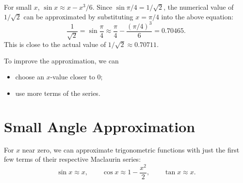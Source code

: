 \begin{example}
    For small $x$, $\sin x \approx x - x^3/6$. Since $\sin{\pi/4} = 1/\sqrt{2}$, the numerical value of $1/\sqrt{2}$ can be approximated by substituting $x = \pi/4$ into the above equation: \[\frac1{\sqrt2} = \sin \frac{\pi}4 \approx \frac{\pi}4 - \frac{(\pi/4)^3}{6} = 0.70465.\] This is close to the actual value of $1/\sqrt{2} \approx 0.70711$.
\end{example}

To improve the approximation, we can 
\begin{itemize}
    \item choose an $x$-value closer to 0;
    \item use more terms of the series.
\end{itemize}

\section{Small Angle Approximation}

For $x$ near zero, we can approximate trigonometric functions with just the first few terms of their respective Maclaurin series: \[\sin x \approx x, \qquad \cos x \approx 1- \frac{x^2}{2}, \qquad \tan x \approx x.\]